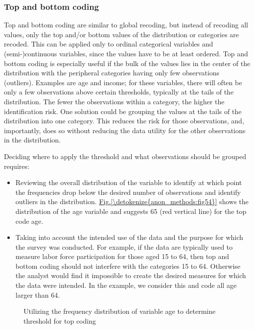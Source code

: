 \documentclass[letterpaper,10pt,english]{sphinxmanual}
\begin{document}
\subsubsection{Top and bottom coding}
\label{\detokenize{anon_methods:top-and-bottom-coding}}
Top and bottom coding are similar to global recoding, but instead of
recoding all values, only the top and/or bottom values of the
distribution or categories are recoded. This can be applied only to
ordinal categorical variables and (semi-)continuous variables, since the
values have to be at least ordered. Top and bottom coding is especially
useful if the bulk of the values lies in the center of the distribution
with the peripheral categories having only few observations (outliers).
Examples are age and income; for these variables, there will often be
only a few observations above certain thresholds, typically at the tails
of the distribution. The fewer the observations within a category, the
higher the identification risk. One solution could be grouping the
values at the tails of the distribution into one category. This reduces
the risk for those observations, and, importantly, does so without
reducing the data utility for the other observations in the
distribution.

Deciding where to apply the threshold and what observations should be
grouped requires:
\begin{itemize}
\item {} 
Reviewing the overall distribution of the variable to identify at
which point the frequencies drop below the desired number of
observations and identify outliers in the distribution. \hyperref[\detokenize{anon_methods:fig54}]{Fig.\@ \ref{\detokenize{anon_methods:fig54}}}
shows the distribution of the age variable and suggests 65 (red
vertical line) for the top code age.

\item {} 
Taking into account the intended use of the data and the purpose for
which the survey was conducted. For example, if the data are
typically used to measure labor force participation for those aged 15
to 64, then top and bottom coding should not interfere with the
categories 15 to 64. Otherwise the analyst would find it impossible
to create the desired measures for which the data were intended. In
the example, we consider this and code all age larger than 64.

\end{itemize}

\begin{figure}[htbp]
\centering
\capstart

\noindent{}
\caption{Utilizing the frequency distribution of variable age to determine threshold for top coding}\label{\detokenize{anon_methods:fig54}}\label{\detokenize{anon_methods:id29}}\end{figure}
\end{document}
